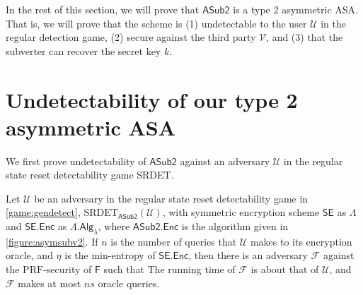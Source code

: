 In the rest of this section, we will prove that $\mathsf{ASub2}$ is a type 2 asymmetric ASA. That is, we will prove that the scheme is (1) undetectable to the user $\mathcal{U}$ in the regular detection game, (2) secure against the third party $\mathcal{V}$, and (3) that the subverter can recover the secret key $k$.

\section{Undetectability of our type 2 asymmetric ASA}
We first prove undetectability of $\mathsf{ASub2}$ against an adversary $\mathcal{U}$ in the regular state reset detectability game SRDET.

\begin{theorem} \label{theorem:detect2}
Let $\mathcal{U}$ be an adversary in the regular state reset detectability game in \autoref{game:gendetect}, $\mathrm{SRDET}_\mathsf{ASub2}(\mathcal{U})$, with symmetric encryption scheme $\mathsf{SE}$ as $\mathsf{\Lambda}$ and $\mathsf{SE.Enc}$ as $\mathsf{\Lambda.Alg}_\lambda$, where $\mathsf{ASub2.Enc}$ is the algorithm given in \autoref{figure:asymsubv2}. If $n$ is the number of queries that $\mathcal{U}$ makes to its encryption oracle, and $\eta$ is the min-entropy of $\mathsf{SE.Enc}$, then there is an adversary $\mathcal{F}$ against the $\mathrm{PRF}$-security of $\mathsf{F}$ such that
The running time of $\mathcal{F}$ is about that of $\mathcal{U}$, and $\mathcal{F}$ makes at most $ns$ oracle queries.
\end{theorem}
